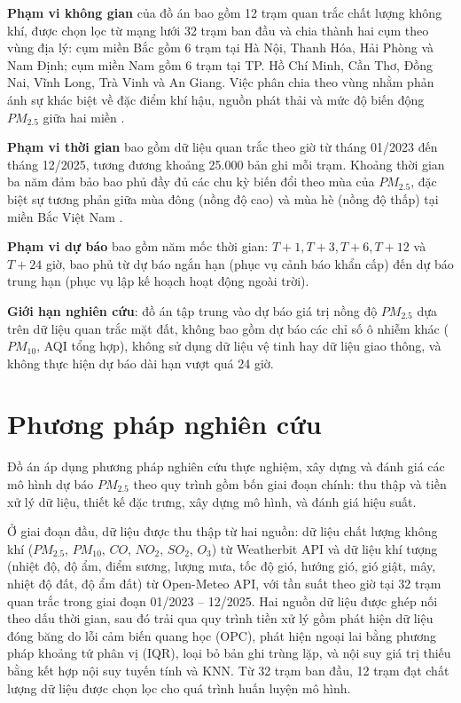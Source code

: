 \textbf{Phạm vi không gian} của đồ án bao gồm 12 trạm quan trắc chất lượng không khí, được chọn lọc từ mạng lưới 32 trạm ban đầu và chia thành hai cụm theo vùng địa lý: cụm miền Bắc gồm 6 trạm tại Hà Nội, Thanh Hóa, Hải Phòng và Nam Định; cụm miền Nam gồm 6 trạm tại TP. Hồ Chí Minh, Cần Thơ, Đồng Nai, Vĩnh Long, Trà Vinh và An Giang. Việc phân chia theo vùng nhằm phản ánh sự khác biệt về đặc điểm khí hậu, nguồn phát thải và mức độ biến động $PM_{2.5}$ giữa hai miền \cite{bui2025urbanization}.

\textbf{Phạm vi thời gian} bao gồm dữ liệu quan trắc theo giờ từ tháng 01/2023 đến tháng 12/2025, tương đương khoảng 25.000 bản ghi mỗi trạm. Khoảng thời gian ba năm đảm bảo bao phủ đầy đủ các chu kỳ biến đổi theo mùa của $PM_{2.5}$, đặc biệt sự tương phản giữa mùa đông (nồng độ cao) và mùa hè (nồng độ thấp) tại miền Bắc Việt Nam \cite{ho2025assessment}.

\textbf{Phạm vi dự báo} bao gồm năm mốc thời gian: $T+1, T+3, T+6, T+12$ và $T+24$ giờ, bao phủ từ dự báo ngắn hạn (phục vụ cảnh báo khẩn cấp) đến dự báo trung hạn (phục vụ lập kế hoạch hoạt động ngoài trời).

\textbf{Giới hạn nghiên cứu}: đồ án tập trung vào dự báo giá trị nồng độ $PM_{2.5}$ dựa trên dữ liệu quan trắc mặt đất, không bao gồm dự báo các chỉ số ô nhiễm khác ($PM_{10}$, AQI tổng hợp), không sử dụng dữ liệu vệ tinh hay dữ liệu giao thông, và không thực hiện dự báo dài hạn vượt quá 24 giờ.

\section{Phương pháp nghiên cứu}

Đồ án áp dụng phương pháp nghiên cứu thực nghiệm, xây dựng và đánh giá các mô hình dự báo $PM_{2.5}$ theo quy trình gồm bốn giai đoạn chính: thu thập và tiền xử lý dữ liệu, thiết kế đặc trưng, xây dựng mô hình, và đánh giá hiệu suất.

Ở giai đoạn đầu, dữ liệu được thu thập từ hai nguồn: dữ liệu chất lượng không khí ($PM_{2.5}$, $PM_{10}$, $CO$, $NO_2$, $SO_2$, $O_3$) từ Weatherbit API và dữ liệu khí tượng (nhiệt độ, độ ẩm, điểm sương, lượng mưa, tốc độ gió, hướng gió, gió giật, mây, nhiệt độ đất, độ ẩm đất) từ Open-Meteo API, với tần suất theo giờ tại 32 trạm quan trắc trong giai đoạn 01/2023 -- 12/2025. Hai nguồn dữ liệu được ghép nối theo dấu thời gian, sau đó trải qua quy trình tiền xử lý gồm phát hiện dữ liệu đóng băng do lỗi cảm biến quang học (OPC), phát hiện ngoại lai bằng phương pháp khoảng tứ phân vị (IQR), loại bỏ bản ghi trùng lặp, và nội suy giá trị thiếu bằng kết hợp nội suy tuyến tính và KNN. Từ 32 trạm ban đầu, 12 trạm đạt chất lượng dữ liệu được chọn lọc cho quá trình huấn luyện mô hình.

